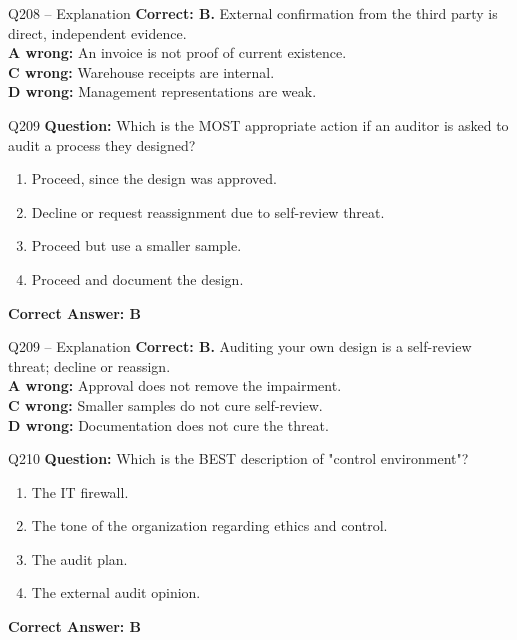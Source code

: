\documentclass[aspectratio=169,10pt]{beamer}
\begin{document}
	\begin{frame}[t]{Q208 -- Explanation}
		\small
		\textbf{Correct: B.} External confirmation from the third party is direct, independent evidence. \\[4pt]
		\textbf{A wrong:} An invoice is not proof of current existence. \\[2pt]
		\textbf{C wrong:} Warehouse receipts are internal. \\[2pt]
		\textbf{D wrong:} Management representations are weak.
	\end{frame}
	
	\begin{frame}[t]{Q209}
		\small
		\textbf{Question:} Which is the MOST appropriate action if an auditor is asked to audit a process they designed?
		\begin{enumerate}[label=\Alph*.,itemsep=1pt,topsep=2pt]
			\item Proceed, since the design was approved.
			\item Decline or request reassignment due to self-review threat.
			\item Proceed but use a smaller sample.
			\item Proceed and document the design.
		\end{enumerate}
		\vspace{4pt}
		\textbf{Correct Answer: B}
	\end{frame}
	
	\begin{frame}[t]{Q209 -- Explanation}
		\small
		\textbf{Correct: B.} Auditing your own design is a self-review threat; decline or reassign. \\[4pt]
		\textbf{A wrong:} Approval does not remove the impairment. \\[2pt]
		\textbf{C wrong:} Smaller samples do not cure self-review. \\[2pt]
		\textbf{D wrong:} Documentation does not cure the threat.
	\end{frame}
	
	\begin{frame}[t]{Q210}
		\small
		\textbf{Question:} Which is the BEST description of "control environment"?
		\begin{enumerate}[label=\Alph*.,itemsep=1pt,topsep=2pt]
			\item The IT firewall.
			\item The tone of the organization regarding ethics and control.
			\item The audit plan.
			\item The external audit opinion.
		\end{enumerate}
		\vspace{4pt}
		\textbf{Correct Answer: B}
	\end{frame}
	
\end{document}
